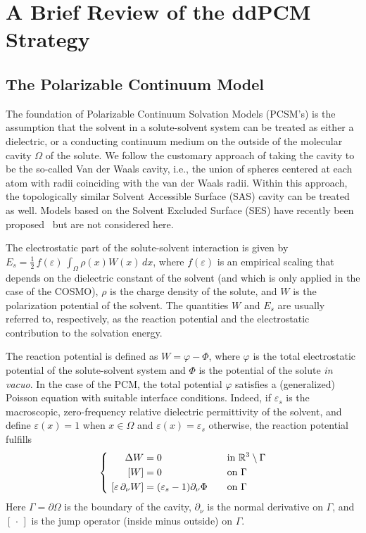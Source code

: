 \section{A Brief Review of the ddPCM Strategy}\label{sec:review}

\subsection{The Polarizable Continuum Model}
The foundation of Polarizable Continuum Solvation Models (PCSM's) is the assumption that the solvent in a solute-solvent system can be treated as either a dielectric, or a conducting continuum medium on the outside of the molecular cavity $\Omega$ of the solute. We follow the customary approach of taking the cavity to be the so-called Van der Waals cavity\cite{ReviewPCM_2005}, i.e., the union of spheres centered at each atom with radii coinciding with the van der Waals radii.
Within this approach, the topologically similar Solvent Accessible Surface (SAS) cavity can be treated as well. 
Models based on the Solvent Excluded Surface (SES) have recently been proposed~\cite{} but are not considered here.

The electrostatic part of the solute-solvent interaction is given by $E_s = \tfrac{1}{2}\, f(\varepsilon)\,\int_\Omega \rho(x) W(x) \, dx$, where $f(\varepsilon)$ is an empirical scaling that depends on the dielectric constant of the solvent (and which is only applied in the case of the COSMO), $\rho$ is the charge density of the solute, and $W$ is the polarization potential of the solvent. The quantities $W$ and $E_s$ are usually referred to, respectively, as the reaction potential and the electrostatic contribution to the solvation energy. 

The reaction potential is defined as $W = \varphi - \Phi$, where $\varphi$ is the total electrostatic potential of the solute-solvent system and $\Phi$ is the potential of the solute \emph{in vacuo}. In the case of the PCM, the total potential $\varphi$ satisfies a (generalized) Poisson equation with suitable interface conditions\cite{Mennucci_JCP_IEF1,Mennucci_JMC_IEF2}. Indeed, if $\varepsilon_s$ is the macroscopic, zero-frequency relative dielectric permittivity of the solvent, and define $\varepsilon(x) = 1$ when $x \in \Omega$ and $\varepsilon(x) = \varepsilon_s$ otherwise, the reaction potential fulfills 
\begin{equation} 
\label{eq:pcmpde}
\left \{ 
\begin{alignedat}{4}
\Delta  W &= 0  &&\mbox{in } \mathbb{R}^3\setminus \Gamma  \\
 \ [W] &= 0  &&\mbox{on } \Gamma\\
\  [\varepsilon \, \partial_\nu W] &= (\varepsilon_s-1) \partial_\nu \Phi &\qquad& \mbox{on } \Gamma
\end{alignedat} 
\right.
\end{equation}
Here $\Gamma=\partial\Omega$ is the boundary of the cavity, $\partial_\nu$ is the normal derivative on $\Gamma$, and $[\,\cdot\,]$ is the jump operator (inside minus outside) on $\Gamma$.

